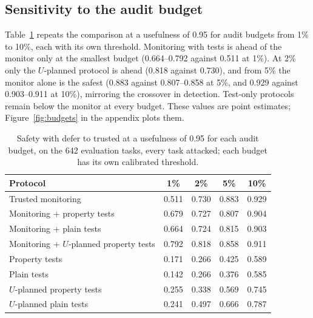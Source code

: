 \subsection{Sensitivity to the audit budget}
\label{sec:budgets}

Table~\ref{tab:budgets} repeats the comparison at a usefulness of 0.95 for audit budgets from 1\% to
10\%, each with its own threshold. Monitoring with tests is ahead of the monitor only at the
smallest budget (0.664--0.792 against 0.511 at 1\%). At 2\% only the $U$-planned protocol is ahead
(0.818 against 0.730), and from 5\% the monitor alone is the safest (0.883 against 0.807--0.858 at
5\%, and 0.929 against 0.903--0.911 at 10\%), mirroring the crossover in detection. Test-only
protocols remain below the monitor at every budget. These values are point estimates;
Figure~\ref{fig:budgets} in the appendix plots them.

\begin{table}[t]
\centering
\small
\begin{tabular}{lcccc}
\toprule
Protocol & 1\% & 2\% & 5\% & 10\% \\
\midrule
Trusted monitoring                      & 0.511 & 0.730 & 0.883 & 0.929 \\
Monitoring + property tests             & 0.679 & 0.727 & 0.807 & 0.904 \\
Monitoring + plain tests                & 0.664 & 0.724 & 0.815 & 0.903 \\
Monitoring + $U$-planned property tests & 0.792 & 0.818 & 0.858 & 0.911 \\
\midrule
Property tests                          & 0.171 & 0.266 & 0.425 & 0.589 \\
Plain tests                             & 0.142 & 0.266 & 0.376 & 0.585 \\
$U$-planned property tests              & 0.255 & 0.338 & 0.569 & 0.745 \\
$U$-planned plain tests                 & 0.241 & 0.497 & 0.666 & 0.787 \\
\bottomrule
\end{tabular}
\caption{Safety with defer to trusted at a usefulness of 0.95 for each audit budget, on the 642
evaluation tasks, every task attacked; each budget has its own calibrated threshold.}
\label{tab:budgets}
\end{table}


